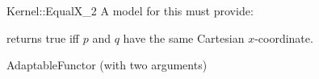 \begin{ccRefFunctionObjectConcept}{Kernel::EqualX_2}
A model for this must provide:


{returns true iff $p$ and $q$ have the same Cartesian $x$-coordinate.}

\ccRefines
AdaptableFunctor (with two arguments)

\ccSeeAlso
{}\\

\end{ccRefFunctionObjectConcept}

